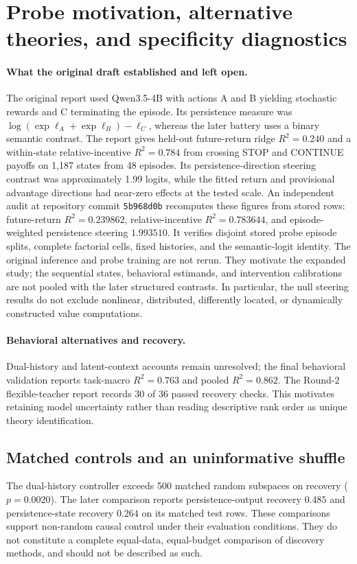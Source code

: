 \documentclass{article}
\begin{document}
\section{Probe motivation, alternative theories, and specificity diagnostics}\label{app:diagnostics}
\paragraph{What the original draft established and left open.}
The original report used Qwen3.5-4B with actions A and B yielding stochastic rewards and C terminating the episode. Its persistence measure was $\log(\exp\ell_A+\exp\ell_B)-\ell_C$, whereas the later battery uses a binary semantic contrast. The report gives held-out future-return ridge $R^2=0.240$ and a within-state relative-incentive $R^2=0.784$ from crossing STOP and CONTINUE payoffs on 1,187 states from 48 episodes. Its persistence-direction steering contrast was approximately 1.99 logits, while the fitted return and provisional advantage directions had near-zero effects at the tested scale. An independent audit at repository commit \texttt{5b968d0b} recomputes these figures from stored rows: future-return $R^2=0.239862$, relative-incentive $R^2=0.783644$, and episode-weighted persistence steering $1.993510$. It verifies disjoint stored probe episode splits, complete factorial cells, fixed histories, and the semantic-logit identity. The original inference and probe training are not rerun. They motivate the expanded study; the sequential states, behavioral estimands, and intervention calibrations are not pooled with the later structured contrasts. In particular, the null steering results do not exclude nonlinear, distributed, differently located, or dynamically constructed value computations.


\paragraph{Behavioral alternatives and recovery.}
Dual-history and latent-context accounts remain unresolved; the final behavioral validation reports task-macro $R^2=0.763$ and pooled $R^2=0.862$. The Round-2 flexible-teacher report records 30 of 36 passed recovery checks. This motivates retaining model uncertainty rather than reading descriptive rank order as unique theory identification.

\subsection{Matched controls and an uninformative shuffle}
The dual-history controller exceeds 500 matched random subspaces on recovery ($p=0.0020$). The later comparison reports persistence-output recovery $0.485$ and persistence-state recovery $0.264$ on its matched test rows. These comparisons support non-random causal control under their evaluation conditions. They do not constitute a complete equal-data, equal-budget comparison of discovery methods, and should not be described as such.
\end{document}
